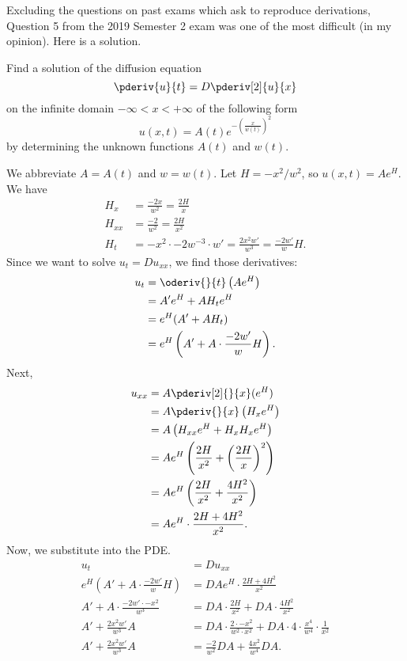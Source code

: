 \documentclass[11pt]{article}
\begin{document}
Excluding the questions on past exams which ask to reproduce derivations, Question 5 from the 2019 Semester 2 exam was one of the most difficult (in my opinion). Here is a solution.

\begin{tcolorbox}
    Find a solution of the diffusion equation
    \[
        \pderiv{u}{t} = D \pderiv[2]{u}{x}
    \]
    on the infinite domain \(-\infty < x < +\infty\) of the following form
    \[
        u(x, t) = A(t) e^{-\left(\frac{x}{w(t)}\right)^{2}}
    \]
    by determining the unknown functions \(A(t)\) and \(w(t)\).
\end{tcolorbox}

We abbreviate \(A = A(t)\) and \(w = w(t)\). Let \(H = -x^{2}/w^{2}\), so \(u(x, t) = A e^{H}\). We have
\begin{align*}
    H_{x} &= \frac{-2x}{w^{2}} = \frac{2H}{x} \\
    H_{xx} &= \frac{-2}{w^{2}} = \frac{2H}{x^{2}} \\
    H_{t} &= -x^{2} \cdot -2 w^{-3} \cdot w' = \frac{2x^{2} w'}{w^{3}} = \frac{-2w'}{w} H.
\end{align*}
Since we want to solve \(u_{t} = D u_{xx}\), we find those derivatives:
\begin{align*}
    u_{t} &= \oderiv{}{t} \left(A e^{H}\right) \\
    &= A' e^{H} + A H_{t} e^{H} \\
    &= e^{H} (A' + A H_{t}) \\
    &= e^{H} \left(A' + A \cdot \frac{-2w'}{w} H\right).
\end{align*}
Next,
\begin{align*}
    u_{xx} &= A \pderiv[2]{}{x} (e^{H}) \\
    &= A \pderiv{}{x} \left(H_{x} e^{H}\right) \\
    &= A \left(H_{xx} e^{H} + H_{x} H_{x} e^{H}\right) \\
    &= A e^{H} \left(\frac{2H}{x^{2}} + \left(\frac{2H}{x}\right)^{2}\right) \\
    &= A e^{H} \left(\frac{2H}{x^{2}} + \frac{4H^{2}}{x^{2}}\right) \\
    &= A e^{H} \cdot \frac{2H + 4H^{2}}{x^{2}}.
\end{align*}
Now, we substitute into the PDE.
\begin{align*}
    u_{t} &= D u_{xx} \\
    e^{H} \left(A' + A \cdot \frac{-2w'}{w} H\right) &= D A e^{H} \cdot \frac{2H + 4H^{2}}{x^{2}} \\
    A' + A \cdot \frac{-2w' \cdot -x^{2}}{w^{3}} &= DA \cdot \frac{2H}{x^{2}} + DA \cdot \frac{4H^{2}}{x^{2}} \\
    A' + \frac{2x^{2} w'}{w^{3}} A &= DA \cdot \frac{2\cdot -x^{2}}{w^{2} \cdot x^{2}} + DA \cdot 4 \cdot \frac{x^{4}}{w^{4}} \cdot \frac{1}{x^{2}} \\
    A' + \frac{2x^{2} w'}{w^{3}}A &= \frac{-2}{w^{2}} DA + \frac{4x^{2}}{w^{4}} DA.
\end{align*}
\end{document}
